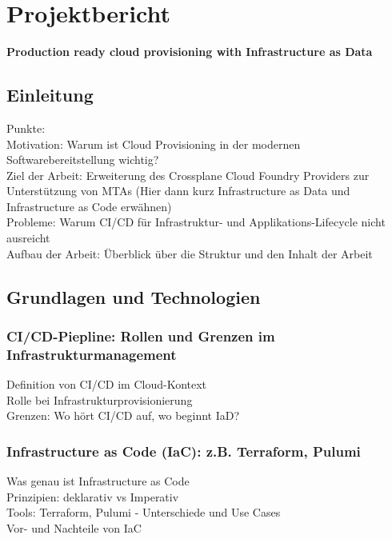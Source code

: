 %
%

\section{Projektbericht}

\begin{center}
    \large
    \textbf{Production ready cloud provisioning with Infrastructure as Data}
\end{center}

\subsection{Einleitung}
Punkte: \\
Motivation: Warum ist Cloud Provisioning in der modernen Softwarebereitstellung wichtig? \\
Ziel der Arbeit: Erweiterung des Crossplane Cloud Foundry Providers zur Unterstützung von MTAs
(Hier dann kurz Infrastructure as Data und Infrastructure as Code erwähnen) \\
Probleme: Warum CI/CD für Infrastruktur- und Applikations-Lifecycle nicht ausreicht \\
Aufbau der Arbeit: Überblick über die Struktur und den Inhalt der Arbeit\cite{lustigeCitation}

\subsection{Grundlagen und Technologien}

\subsubsection{CI/CD-Piepline: Rollen und Grenzen im Infrastrukturmanagement}
Definition von CI/CD im Cloud-Kontext \\
Rolle bei Infrastrukturprovisionierung \\
Grenzen: Wo hört CI/CD auf, wo beginnt IaD?

\subsubsection{Infrastructure as Code (IaC): z.B. Terraform, Pulumi}
Was genau ist Infrastructure as Code \\
Prinzipien: deklarativ vs Imperativ \\
Tools: Terraform, Pulumi - Unterschiede und Use Cases \\
Vor- und Nachteile von IaC

